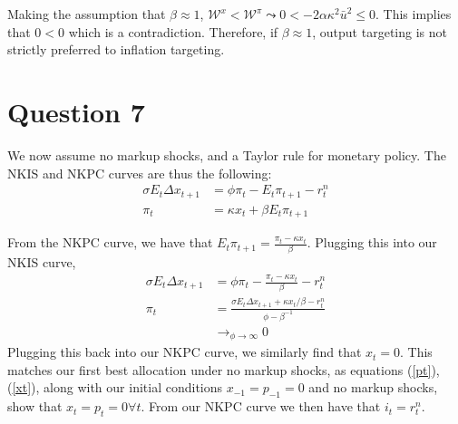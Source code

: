 \documentclass[11pt]{article} %
\begin{document}
Making the assumption that $\beta \approx 1 $, $\mathcal{W}^{x} < \mathcal{W}^{\pi} \leadsto 0< -2\alpha\kappa^2  \bar{u}^2 \leq0$. This implies that $0<0$ which is a contradiction. Therefore, if $\beta \approx 1$, output targeting is not strictly preferred to inflation targeting.
\section{Question 7}
We now assume no markup shocks, and a Taylor rule for monetary policy. The NKIS and NKPC curves are thus the following:
\begin{align*}
\sigma E_t \Delta x_{t+1} &= \phi \pi_t - E_t\pi_{t+1} - r_t^n\\
\pi_t &= \kappa x_t + \beta E_t\pi_{t+1}
\end{align*}

From the NKPC curve, we have that $E_{t}\pi_{t+1} = \frac{\pi_t-\kappa x_t }{\beta}$. Plugging this into our NKIS curve,
\begin{align*}
\sigma E_t \Delta x_{t+1} &= \phi \pi_t -\frac{\pi_t-\kappa x_t }{\beta} - r_t^n\\
\pi_t &= \frac{\sigma E_t\Delta x_{t+1} + \kappa x_t/\beta - r_t^n}{\phi - \beta^{-1}}\\
&\rightarrow_{\phi \rightarrow \infty} 0
\end{align*}
 Plugging this back into our NKPC curve, we similarly find that $x_t = 0$. This matches our first best allocation under no markup shocks, as equations (\ref{pt}),(\ref{xt}), along with our initial conditions $x_{-1} = p_{-1} = 0$ and no markup shocks, show that $x_t = p_t = 0 \forall t$. From our NKPC curve we then have that $i_t = r_t^n.$
\end{document}
